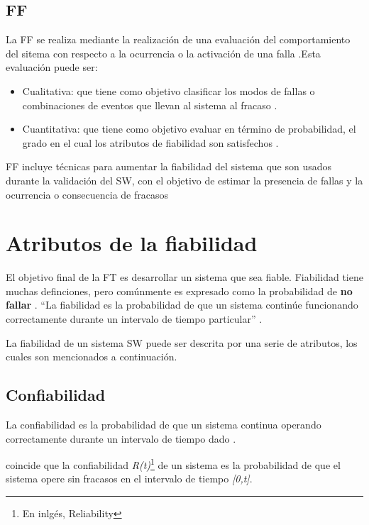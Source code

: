 \subsection{\acl{FF}}
La \ac{FF} se realiza mediante la realización de una evaluación del comportamiento del sitema con 
respecto a la ocurrencia o la activación de una falla \citep{FTDesign}.Esta evaluación puede ser:
\begin{itemize}
 \item Cualitativa: que tiene como objetivo clasificar los modos de fallas o combinaciones de 
eventos que llevan al sistema al fracaso \citep{FTDesign}. 
 \item Cuantitativa: que tiene como objetivo evaluar en término de probabilidad, el grado en el 
cual los atributos de fiabilidad son satisfechos \citep{FTDesign}. 
\end{itemize}

\ac{FF} incluye técnicas para aumentar la fiabilidad del sistema que son usados durante la 
validación del \ac{SW}, con el objetivo de estimar la presencia de fallas y la ocurrencia o 
consecuencia de fracasos \citep{Pullum01}

\section{Atributos de la fiabilidad}
El objetivo final de la \ac{FT} es desarrollar un sistema que sea fiable. Fiabilidad tiene muchas 
definciones, pero comúnmente es expresado como la probabilidad de \textbf{no fallar} 
\citep{FTAvionics}. ``La fiabilidad es la probabilidad de que un sistema continúe funcionando 
correctamente durante un intervalo de tiempo particular'' \citep{SoftwareFaultToleranceATutorial}.

La fiabilidad de un sistema \ac{SW} puede ser descrita por una serie de atributos, los cuales son 
mencionados a continuación.

\subsection{Confiabilidad}\label{subsec:confiabilidad}
La confiabilidad es la probabilidad de que un sistema continua operando correctamente durante un 
intervalo de tiempo dado \citep{SoftwareFaultToleranceATutorial}. 

\cite{FTDesign} coincide que la confiabilidad \textit{R(t)}\footnote{En inlgés, Reliability} de un 
sistema es la probabilidad de que el sistema opere sin fracasos en el intervalo de tiempo 
\textit{[0,t]}. 

